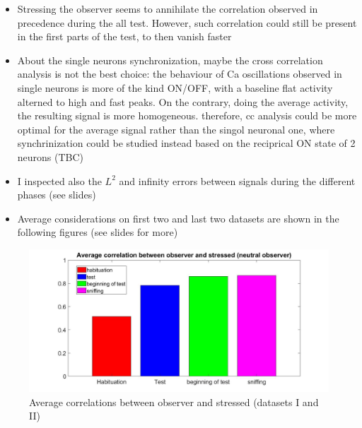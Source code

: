 \documentclass[a4paper]{article}
\begin{document}
	\begin{itemize}
		
		\item Stressing the observer seems to annihilate the correlation observed in precedence during the all test. However, such correlation could still be present in the first parts of the test, to then vanish faster
		
		\item About the single neurons synchronization, maybe the cross correlation analysis is not the best choice: the behaviour of Ca oscillations observed in single neurons is more of the kind ON/OFF, with a baseline flat activity alterned to high and fast peaks. On the contrary, doing the average activity, the resulting signal is more homogeneous. therefore, cc analysis could be more optimal for the average signal rather than the singol neuronal one, where synchrinization could be studied instead based on the reciprical ON state of 2 neurons (TBC)
		
		\item I inspected also the $L^2$ and infinity errors between signals during the different phases (see slides)
		
		\item Average considerations on first two and last two datasets are shown in the following figures (see slides for more)
		
	\end{itemize}	
		
		
		
			\begin{figure}[H]
			\begin{center}
				\hspace*{-1cm}
				\includegraphics[scale=.36]{avg_corr_stress.jpg} 
			\end{center}  
			\caption{Average correlations between observer and stressed (datasets I and II)}
			
		\end{figure}
	
\end{document}
